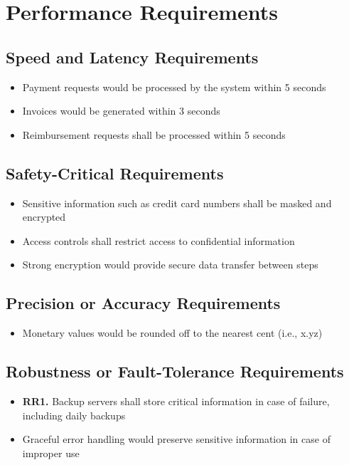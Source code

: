 \documentclass[12pt]{article}
\begin{document}
\section{Performance Requirements}
\subsection{Speed and Latency Requirements}
\begin{itemize}
    \item Payment requests would be processed by the system within 5 seconds
    \item Invoices would be generated within 3 seconds
    \item Reimbursement requests shall be processed within 5 seconds
\end{itemize}

\subsection{Safety-Critical Requirements}
\begin{itemize}
    \item Sensitive information such as credit card numbers shall be masked and encrypted
    \item Access controls shall restrict access to confidential information
    \item Strong encryption would provide secure data transfer between steps
\end{itemize}

\subsection{Precision or Accuracy Requirements}
\begin{itemize}
    \item Monetary values would be rounded off to the nearest cent (i.e., x.yz)
\end{itemize}

\subsection{Robustness or Fault-Tolerance Requirements}
\begin{itemize}
    \item \textbf{RR1. }Backup servers shall store critical information in case of failure, including daily backups
    \item Graceful error handling would preserve sensitive information in case of improper use
\end{itemize}
\end{document}
